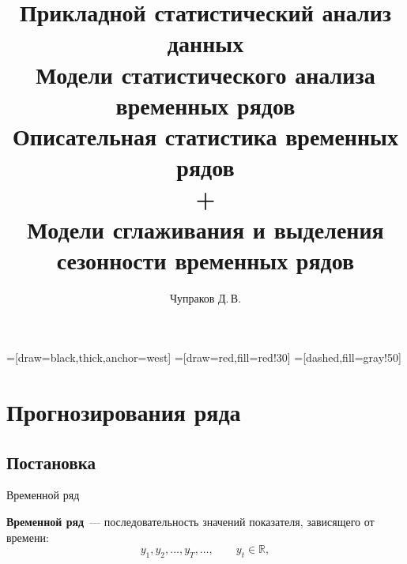 \documentclass[10pt,pdf,utf8,hyperref={unicode},aspectratio=169]{beamer}
\title{Прикладной статистический анализ данных\\
	   Модели статистического анализа временных рядов\\[1em]
	   \LARGE{\bfseries Описательная статистика временных рядов \\+\\ Модели сглаживания и выделения сезонности временных рядов}}
\author{Чупраков Д.\,В.}
\date{}
\begin{document}
=[draw=black,thick,anchor=west]
=[draw=red,fill=red!30]
=[dashed,fill=gray!50]

\begin{frame}
    \titlepage
\end{frame}

\section{Прогнозирования ряда}
\subsection{Постановка}

\begin{frame}{Временной ряд}{}


\textbf{Временной ряд}~--- последовательность значений показателя, зависящего от времени: 
$$
	y_1, y_2, \ldots, y_T, \ldots, \qquad y_t\in\mathbb{R},
$$

% 
% 
% 
% 
% 


\end{frame}
\end{document}
